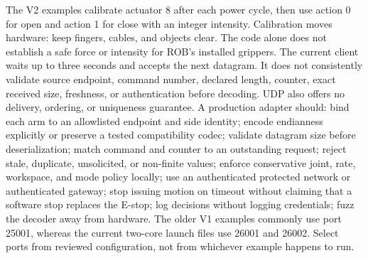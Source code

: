 {}
\markdownRendererSectionEnd \markdownRendererSectionBegin
{}\markdownRendererInterblockSeparator
{}The V2 examples calibrate actuator 8 after each power cycle, then use action 0 for open and action 1 for close with an integer intensity. Calibration moves hardware: keep fingers, cables, and objects clear. The code alone does not establish a safe force or intensity for ROB's installed grippers.\markdownRendererInterblockSeparator
{}
\markdownRendererSectionEnd \markdownRendererSectionBegin
{}\markdownRendererInterblockSeparator
{}The current client waits up to three seconds and accepts the next datagram. It does not consistently validate source endpoint, command number, declared length, counter, exact received size, freshness, or authentication before decoding. UDP also offers no delivery, ordering, or uniqueness guarantee.\markdownRendererParagraphSeparator
{}A production adapter should:\markdownRendererInterblockSeparator
{}\markdownRendererOlBegin
{}bind each arm to an allowlisted endpoint and side identity;\markdownRendererOlItemEnd 
{}encode endianness explicitly or preserve a tested compatibility codec;\markdownRendererOlItemEnd 
{}validate datagram size before deserialization;\markdownRendererOlItemEnd 
{}match command and counter to an outstanding request;\markdownRendererOlItemEnd 
{}reject stale, duplicate, unsolicited, or non-finite values;\markdownRendererOlItemEnd 
{}enforce conservative joint, rate, workspace, and mode policy locally;\markdownRendererOlItemEnd 
{}use an authenticated protected network or authenticated gateway;\markdownRendererOlItemEnd 
{}stop issuing motion on timeout without claiming that a software stop replaces the E-stop;\markdownRendererOlItemEnd 
{}log decisions without logging credentials;\markdownRendererOlItemEnd 
{}fuzz the decoder away from hardware.\markdownRendererOlItemEnd 
\markdownRendererOlEnd \markdownRendererInterblockSeparator
{}The older V1 examples commonly use port 25001, whereas the current two-core launch files use 26001 and 26002. Select ports from reviewed configuration, not from whichever example happens to run.\markdownRendererInterblockSeparator
{}
\markdownRendererSectionEnd 
